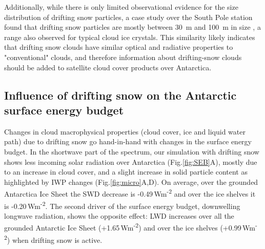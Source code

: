 \documentclass[draft]{agujournal2019}
\begin{document}
Additionally, while there is only limited observational evidence for the size distribution of drifting snow particles, a case study over the South Pole station found that drifting snow particles are mostly between 30~{\textmu}m and 100~{\textmu}m in size \cite{Lawson2006}, a range also observed for typical cloud ice crystals. This similarity likely indicates that drifting snow clouds have similar optical and radiative properties to "conventional" clouds, and therefore information about drifting-snow clouds should be added to satellite cloud cover products over Antarctica.

\subsection{Influence of drifting snow on the Antarctic surface energy budget}

Changes in cloud macrophysical properties (cloud cover, ice and liquid water path) due to drifting snow go hand-in-hand with changes in the surface energy budget. In the shortwave part of the spectrum, our simulation with drifting snow shows less incoming solar radiation over Antarctica (Fig.\ref{fig:SEB}A), mostly due to an increase in cloud cover, and a slight increase in solid particle content as highlighted by IWP changes (Fig.\ref{fig:micro}A,D). On average, over the grounded Antarctica Ice Sheet the SWD decrease is -0.49\,Wm\textsuperscript{-2} and over the ice shelves it is -0.20\,Wm\textsuperscript{-2}. The second driver of the surface energy budget, downwelling longwave radiation, shows the opposite effect: LWD increases over all the grounded Antarctic Ice Sheet (+1.65\,Wm\textsuperscript{-2}) and over the ice shelves (+0.99\,Wm\textsuperscript{-2}) when drifting snow is active.
\end{document}

